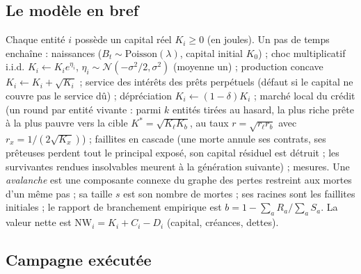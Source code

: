 \documentclass[11pt,a4paper]{article}
\newcommand{\NW}{\mathrm{NW}}
\begin{document}
\subsection{Le modèle en bref}
\label{sec:modele}

Chaque entité $i$ possède un capital réel $K_i\ge0$ (en joules).
Un pas de temps enchaîne : naissances
($B_t\sim\mathrm{Poisson}(\lambda)$, capital initial $K_0$) ; choc
multiplicatif i.i.d. $K_i\!\leftarrow\!K_ie^{\eta_i}$,
$\eta_i\sim\mathcal N(-\sigma^2/2,\sigma^2)$ (moyenne un) ; production
concave $K_i\!\leftarrow\!K_i+\sqrt{K_i}$ ; service des intérêts des
prêts perpétuels (défaut si le capital ne couvre pas le service dû) ;
dépréciation $K_i\!\leftarrow\!(1-\delta)K_i$ ; marché local du crédit
(un round par entité vivante : parmi $k$ entités tirées au hasard, la
plus riche prête à la plus pauvre vers la cible
$K^\ast=\sqrt{K_\ell K_b}$, au taux $r=\sqrt{r_\ell r_b}$ avec
$r_x=1/(2\sqrt{K_x})$) ; faillites en cascade (une morte annule ses
contrats, ses prêteuses perdent tout le principal exposé, son capital
résiduel est détruit ; les survivantes rendues insolvables meurent à la
génération suivante) ; mesures. Une \emph{avalanche} est une composante
connexe du graphe des pertes restreint aux mortes d'un même pas ; sa
taille $s$ est son nombre de mortes ; ses racines sont les faillites
initiales ; le rapport de branchement empirique est
$b=1-\sum_aR_a/\sum_aS_a$. La valeur nette est
$\NW_i=K_i+C_i-D_i$ (capital, créances, dettes).

\subsection{Campagne exécutée}
\end{document}
